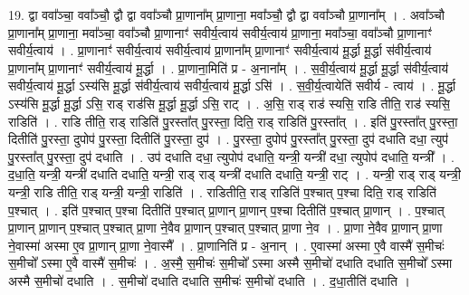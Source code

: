 \documentclass[17pt]{extarticle}
\begin{document}
19. द्वा ववा᳚ञ्चा॒ ववा᳚ञ्चौ॒ द्वौ द्वा ववा᳚ञ्चौ प्रा॒णाना᳚म् प्रा॒णाना॒ मवा᳚ञ्चौ॒ द्वौ द्वा ववा᳚ञ्चौ प्रा॒णाना᳚म् । . अवा᳚ञ्चौ प्रा॒णाना᳚म् प्रा॒णाना॒ मवा᳚ञ्चा॒ ववा᳚ञ्चौ प्रा॒णानाꣳ॑ सवीर्य॒त्वाय॑ सवीर्य॒त्वाय॑ प्रा॒णाना॒ मवा᳚ञ्चा॒ ववा᳚ञ्चौ प्रा॒णानाꣳ॑ सवीर्य॒त्वाय॑ । . प्रा॒णानाꣳ॑ सवीर्य॒त्वाय॑ सवीर्य॒त्वाय॑ प्रा॒णाना᳚म् प्रा॒णानाꣳ॑ सवीर्य॒त्वाय॑ मू॒र्द्धा मू॒र्द्धा स॑वीर्य॒त्वाय॑ प्रा॒णाना᳚म् प्रा॒णानाꣳ॑ सवीर्य॒त्वाय॑ मू॒र्द्धा । . प्रा॒णाना॒मिति॑ प्र - अ॒नाना᳚म् । . स॒वी॒र्य॒त्वाय॑ मू॒र्द्धा मू॒र्द्धा स॑वीर्य॒त्वाय॑ सवीर्य॒त्वाय॑ मू॒र्द्धा ऽस्य॑सि मू॒र्द्धा स॑वीर्य॒त्वाय॑ सवीर्य॒त्वाय॑ मू॒र्द्धा ऽसि॑ । . स॒वी॒र्य॒त्वायेति॑ सवीर्य - त्वाय॑ । . मू॒र्द्धा ऽस्य॑सि मू॒र्द्धा मू॒र्द्धा ऽसि॒ राड् राड॑सि मू॒र्द्धा मू॒र्द्धा ऽसि॒ राट् । . अ॒सि॒ राड् राड॑ स्यसि॒ राडि तीति॒ राड॑ स्यसि॒ राडिति॑ । . राडि तीति॒ राड् राडिति॑ पु॒रस्ता᳚त् पु॒रस्ता॒ दिति॒ राड् राडिति॑ पु॒रस्ता᳚त् । . इति॑ पु॒रस्ता᳚त् पु॒रस्ता॒ दितीति॑ पु॒रस्ता॒ दुपोप॑ पु॒रस्ता॒ दितीति॑ पु॒रस्ता॒ दुप॑ । . पु॒रस्ता॒ दुपोप॑ पु॒रस्ता᳚त् पु॒रस्ता॒ दुप॑ दधाति दधा॒ त्युप॑ पु॒रस्ता᳚त् पु॒रस्ता॒ दुप॑ दधाति । . उप॑ दधाति दधा॒ त्युपोप॑ दधाति॒ यन्त्री॒ यन्त्री॑ दधा॒ त्युपोप॑ दधाति॒ यन्त्री᳚ । . द॒धा॒ति॒ यन्त्री॒ यन्त्री॑ दधाति दधाति॒ यन्त्री॒ राड् राड् यन्त्री॑ दधाति दधाति॒ यन्त्री॒ राट् । . यन्त्री॒ राड् राड् यन्त्री॒ यन्त्री॒ राडि तीति॒ राड् यन्त्री॒ यन्त्री॒ राडिति॑ । . राडितीति॒ राड् राडिति॑ प॒श्चात् प॒श्चा दिति॒ राड् राडिति॑ प॒श्चात् । . इति॑ प॒श्चात् प॒श्चा दितीति॑ प॒श्चात् प्रा॒णान् प्रा॒णान् प॒श्चा दितीति॑ प॒श्चात् प्रा॒णान् । . प॒श्चात् प्रा॒णान् प्रा॒णान् प॒श्चात् प॒श्चात् प्रा॒णा ने॒वैव प्रा॒णान् प॒श्चात् प॒श्चात् प्रा॒णा ने॒व । . प्रा॒णा ने॒वैव प्रा॒णान् प्रा॒णा ने॒वास्मा॑ अस्मा ए॒व प्रा॒णान् प्रा॒णा ने॒वास्मै᳚ । . प्रा॒णानिति॑ प्र - अ॒नान् । . ए॒वास्मा॑ अस्मा ए॒वै वास्मै॑ स॒मीचः॑ स॒मीचो᳚ ऽस्मा ए॒वै वास्मै॑ स॒मीचः॑ । . अ॒स्मै॒ स॒मीचः॑ स॒मीचो᳚ ऽस्मा अस्मै स॒मीचो॑ दधाति दधाति स॒मीचो᳚ ऽस्मा अस्मै स॒मीचो॑ दधाति । . स॒मीचो॑ दधाति दधाति स॒मीचः॑ स॒मीचो॑ दधाति । . द॒धा॒तीति॑ दधाति । \newline
\pagebreak
{}
\end{document}
